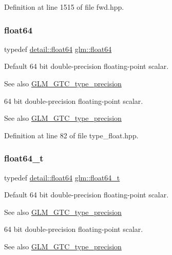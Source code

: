 Definition at line 1515 of file fwd.\+hpp.

\mbox{\label{group__gtc__type__precision_gab721f828b41f46b20cf4883b50733d3b}} 
\subsubsection{\texorpdfstring{float64}{float64}}
{\footnotesize\ttfamily typedef \hyperlink{namespaceglm_1_1detail_a5a0a9a1be3fd5dbe6d47ae45c3022b06}{detail\+::float64} \hyperlink{group__gtc__type__precision_gab721f828b41f46b20cf4883b50733d3b}{glm\+::float64}}

Default 64 bit double-\/precision floating-\/point scalar. \begin{DoxySeeAlso}{See also}
\hyperlink{group__gtc__type__precision}{G\+L\+M\+\_\+\+G\+T\+C\+\_\+type\+\_\+precision}
\end{DoxySeeAlso}
64 bit double-\/precision floating-\/point scalar. \begin{DoxySeeAlso}{See also}
\hyperlink{group__gtc__type__precision}{G\+L\+M\+\_\+\+G\+T\+C\+\_\+type\+\_\+precision} 
\end{DoxySeeAlso}


Definition at line 82 of file type\+\_\+float.\+hpp.

\mbox{\label{group__gtc__type__precision_gade966a3eb25ebeb16dd53c40d3fdeb46}} 
\subsubsection{\texorpdfstring{float64\+\_\+t}{float64\_t}}
{\footnotesize\ttfamily typedef \hyperlink{namespaceglm_1_1detail_a5a0a9a1be3fd5dbe6d47ae45c3022b06}{detail\+::float64} \hyperlink{group__gtc__type__precision_gade966a3eb25ebeb16dd53c40d3fdeb46}{glm\+::float64\+\_\+t}}

Default 64 bit double-\/precision floating-\/point scalar. \begin{DoxySeeAlso}{See also}
\hyperlink{group__gtc__type__precision}{G\+L\+M\+\_\+\+G\+T\+C\+\_\+type\+\_\+precision}
\end{DoxySeeAlso}
64 bit double-\/precision floating-\/point scalar. \begin{DoxySeeAlso}{See also}
\hyperlink{group__gtc__type__precision}{G\+L\+M\+\_\+\+G\+T\+C\+\_\+type\+\_\+precision} 
\end{DoxySeeAlso}



